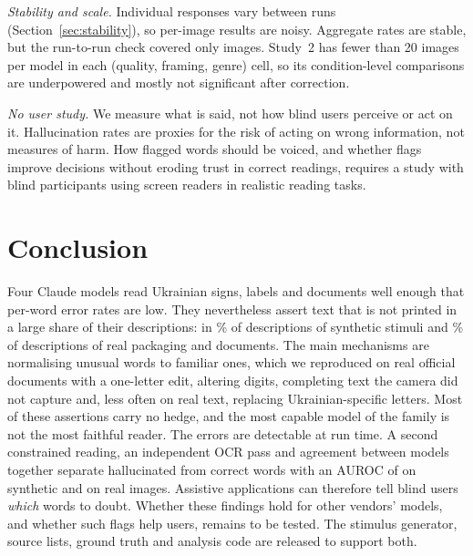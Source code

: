 \emph{Stability and scale.} Individual responses vary between runs (Section~\ref{sec:stability}), so per-image results are noisy. Aggregate rates are stable, but the run-to-run check covered only \StabN{} images. Study~2 has fewer than 20 images per model in each (quality, framing, genre) cell, so its condition-level comparisons are underpowered and mostly not significant after correction.

\emph{No user study.} We measure what is said, not how blind users perceive or act on it. Hallucination rates are proxies for the risk of acting on wrong information, not measures of harm. How flagged words should be voiced, and whether flags improve decisions without eroding trust in correct readings, requires a study with blind participants using screen readers in realistic reading tasks.

\section{Conclusion}\label{sec:conclusion}

Four Claude models read Ukrainian signs, labels and documents well enough that per-word error rates are low. They nevertheless assert text that is not printed in a large share of their descriptions: in \RangeImg\% of descriptions of synthetic stimuli and \RealRangeImg\% of descriptions of real packaging and documents. The main mechanisms are normalising unusual words to familiar ones, which we reproduced on real official documents with a one-letter edit, altering digits, completing text the camera did not capture and, less often on real text, replacing Ukrainian-specific letters. Most of these assertions carry no hedge, and the most capable model of the family is not the most faithful reader. The errors are detectable at run time. A second constrained reading, an independent OCR pass and agreement between models together separate hallucinated from correct words with an AUROC of \RangeAucComb{} on synthetic and \RealRangeAucComb{} on real images. Assistive applications can therefore tell blind users \emph{which} words to doubt. Whether these findings hold for other vendors' models, and whether such flags help users, remains to be tested. The stimulus generator, source lists, ground truth and analysis code are released to support both.

